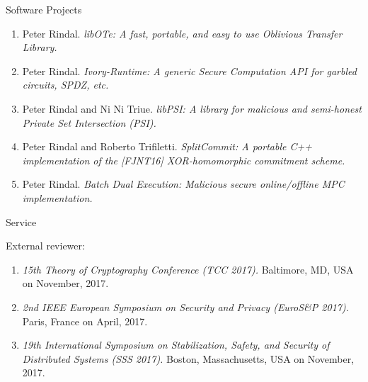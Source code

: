 \documentclass{resume} %
\begin{document}
\begin{rSection}{Software Projects}
	
	
	\begin{enumerate}[label=S\arabic*]
		
		\item Peter Rindal. \emph{libOTe: A fast, portable, and easy to use Oblivious Transfer Library.} 
		
		\item Peter Rindal. \emph{Ivory-Runtime: A generic Secure Computation API for garbled circuits, SPDZ, etc. } 
		
		\item Peter Rindal and Ni Ni Triue. \emph{libPSI: A library for malicious and semi-honest Private Set Intersection (PSI).}
		
		\item Peter Rindal and Roberto Trifiletti. \emph{SplitCommit: A portable C++ implementation of the [FJNT16] XOR-homomorphic commitment scheme.}
		
		\item Peter Rindal. \emph{Batch Dual Execution: Malicious secure online/offline MPC implementation.} 
	\end{enumerate}
	
\end{rSection}




\begin{rSection}{Service}
	
	External reviewer:
	\begin{enumerate}[label=E\arabic*]
		
		\item \emph{15th Theory of Cryptography Conference (TCC 2017).}  Baltimore, MD, USA on November, 2017.
		
		\item \emph{2nd IEEE European Symposium on Security and Privacy (EuroS\&P 2017).} Paris, France on April, 2017.
		
		\item \emph{19th International Symposium on Stabilization, Safety, and Security of Distributed Systems (SSS 2017).} Boston, Massachusetts, USA on November, 2017.
		
	\end{enumerate}
	
\end{rSection}
\end{document}
